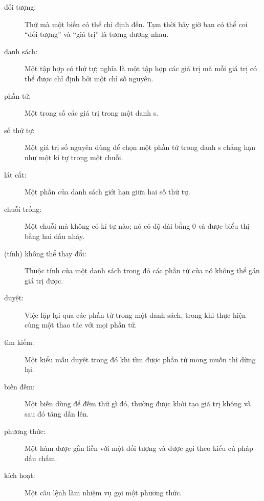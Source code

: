 \documentclass[11pt]{book}
\begin{document}
\begin{description}

\item[đối tượng:] Thứ mà một biến có thể chỉ định đến. Tạm thời bây giờ
bạn có thể coi ``đối tượng'' và ``giá trị'' là tương đương nhau.

\item[danh sách:] Một tập hợp có thứ tự; nghĩa là một tập hợp các giá trị mà mỗi
giá trị có thể được chỉ định bởi một chỉ số nguyên.

\item[phần tử:] Một trong số các giá trị trong một danh s.

\item[số thứ tự:] Một giá trị số nguyên dùng để chọn một phần tử trong danh s
chẳng hạn như một kí tự trong một chuỗi.

\item[lát cắt:] Một phần của danh sách giới hạn giữa hai số thứ tự.

\item[chuỗi trống:] Một chuỗi mà không có kí tự nào; nó có độ dài bằng 0 và
được biểu thị bằng hai dấu nháy.

\item[(tính) không thể thay đổi:] Thuộc tính của một danh sách trong đó các phần tử của nó
không thể gán giá trị được.

\item[duyệt:] Việc lặp lại qua các phần tử trong một danh sách, trong khi thực hiện 
cùng một thao tác với mọi phần tử.

\item[tìm kiếm:]  Một kiểu mẫu duyệt trong đó khi tìm được phần tử mong muốn
thì dừng lại.

\item[biến đếm:] Một biến dùng để đếm thứ gì đó, thường được khởi tạo giá trị 
không và sau đó tăng dần lên.

\item[phương thức:] Một hàm được gắn liền với một đối tượng và được gọi theo
kiểu cú pháp dấu chấm.

\item[kích hoạt:] Một câu lệnh làm nhiệm vụ gọi một phương thức.

\end{description}
\end{document}
